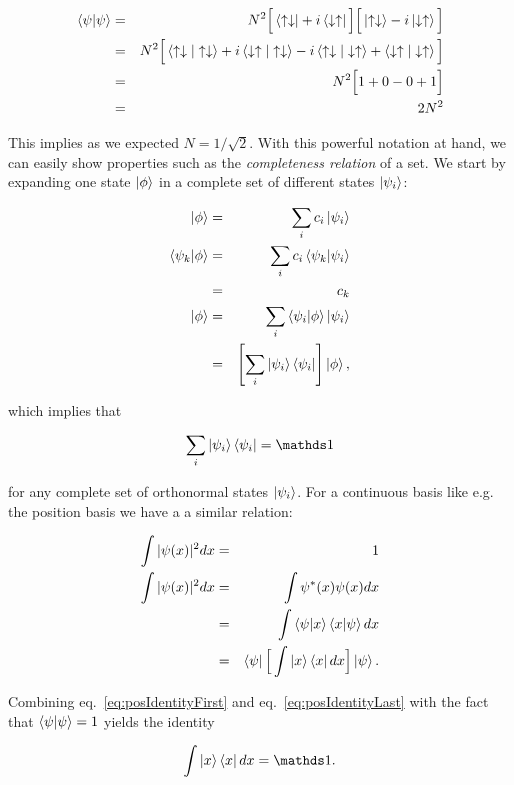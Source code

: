 \begin{eqnarray*}
 \left\langle \psi | \psi\right\rangle &=& N^2\Big[\left< \uparrow\downarrow \right| +i\left< \downarrow\uparrow \right|\Big]\Big[\left| \uparrow\downarrow \right> -i\left| \downarrow\uparrow \right>\Big] \\
 &=& N^2\Big[\left\langle \uparrow\downarrow | \uparrow\downarrow\right\rangle + i\left\langle \downarrow\uparrow | \uparrow\downarrow\right\rangle - i\left\langle \uparrow\downarrow | \downarrow\uparrow\right\rangle + \left\langle \downarrow\uparrow | \downarrow\uparrow\right\rangle\Big] \\
 &=& N^2\Big[1 + 0 - 0 + 1\Big] \\
 &=& 2N^2
\end{eqnarray*}

This implies as we expected $N=1/\sqrt{2}$. With this powerful notation at hand, we can easily show properties such as the \textit{completeness relation} of a set. We start by expanding one state $\left| \phi \right>$ in a complete set of different states $\left| \psi_i \right>$:

\begin{eqnarray*}
 \left| \phi \right>            &=& \displaystyle\sum_i c_i\left| \psi_i \right>\\
 \left\langle \psi_k | \phi\right\rangle &=& \displaystyle\sum_i c_i\left\langle \psi_k | \psi_i\right\rangle\\
                       &=& c_k\\
 \left| \phi \right>            &=& \displaystyle\sum_i \left\langle \psi_i | \phi\right\rangle\left| \psi_i \right>\\
                       &=& \left[\displaystyle\sum_i \left| \psi_i \right>\left< \psi_i \right|\right]\left| \phi \right>,
\end{eqnarray*}

which implies that

\begin{equation}
 \displaystyle\sum_i \ket{\psi_i}\bra{\psi_i} = \I
 \label{eq:Completeness}
\end{equation}

for any complete set of orthonormal states $\left| \psi_i \right>$. For a continuous basis like e.g. the position basis we have a a similar relation:

\begin{eqnarray}
 \int |\psi(x)|^2dx    &=& 1 \label{eq:posIdentityFirst} \\
 \int |\psi(x)|^2dx    &=& \int \psi^\ast(x)\psi(x)dx \nonumber \\
                       &=& \int \left\langle \psi | x\right\rangle\left\langle x | \psi\right\rangle dx \nonumber \\
                       &=& \left< \psi \right|\Big[\int \left| x \right>\left< x \right|dx\Big]\left| \psi \right> \label{eq:posIdentityLast}.
\end{eqnarray}

Combining eq.~\ref{eq:posIdentityFirst} and eq.~\ref{eq:posIdentityLast} with the fact that $\left\langle \psi | \psi\right\rangle = 1$ yields the identity

\begin{equation}
 \int \ket{x}\bra{x}dx = \I.
 \label{eq:CompletenessCont}
\end{equation}
